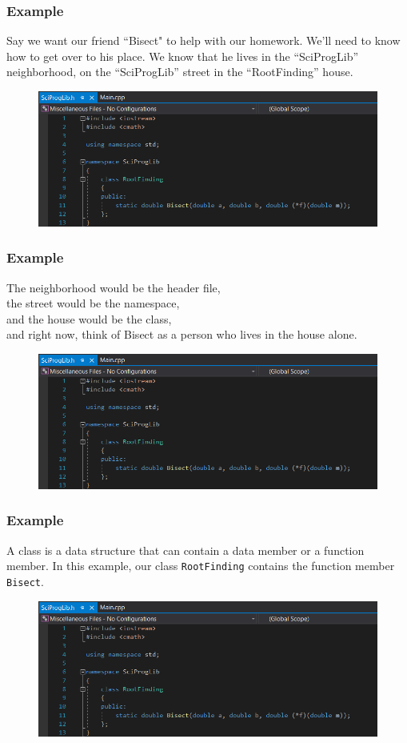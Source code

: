 \documentclass{if-beamer}
\begin{document}
\begin{frame}
	\frametitle{Example}
	Say we want our friend “Bisect" to help with our homework. We’ll need to know how to get over to his place. We know that he lives in the “SciProgLib” neighborhood, on the “SciProgLib” street in the “RootFinding” house.
	\begin{figure}
		\centering
		\includegraphics[width = \textwidth]{figures/headerfile}
	\end{figure}
\end{frame}

\begin{frame}
	\frametitle{Example}
	The neighborhood would be the header file, \\
	the street would be the namespace, \\
	and the house would be the class, \\
	and right now, think of Bisect as a person who lives in the house alone.
	\begin{figure}
		\centering
		\includegraphics[width = \textwidth]{figures/headerfile}
	\end{figure}
\end{frame}

\begin{frame}
	\frametitle{Example}
	A class is a data structure that can contain a data member or a function member. In this example, our class \texttt{RootFinding} contains the function member \texttt{Bisect}. 
	\begin{figure}
		\centering
		\includegraphics[width = \textwidth]{figures/headerfile}
	\end{figure}
\end{frame}
\end{document}

